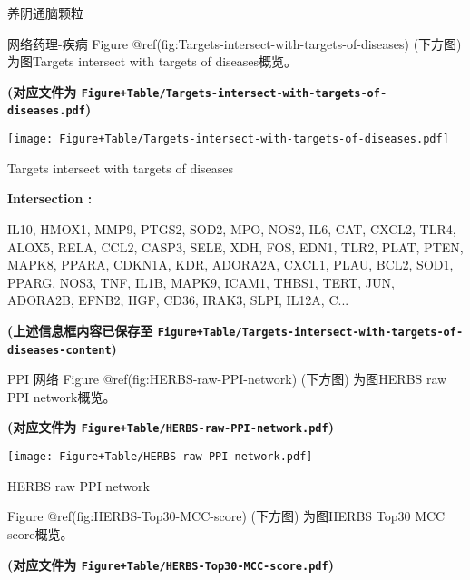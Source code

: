 \documentclass[
  ignorenonframetext,
]{beamer}
\begin{document}
\begin{frame}[fragile]{养阴通脑颗粒}
\begin{block}{网络药理-疾病}
Figure @ref(fig:Targets-intersect-with-targets-of-diseases) (下方图)
为图Targets intersect with targets of diseases概览。

\textbf{(对应文件为
\texttt{Figure+Table/Targets-intersect-with-targets-of-diseases.pdf})}

\def\@captype{figure}
\begin{center}
\texttt{[image: Figure+Table/Targets-intersect-with-targets-of-diseases.pdf]}
\caption{Targets intersect with targets of diseases}\label{fig:Targets-intersect-with-targets-of-diseases}
\end{center}
\begin{center}\begin{tcolorbox}[colback=gray!10, colframe=gray!50, width=0.9\linewidth, arc=1mm, boxrule=0.5pt]
\textbf{
Intersection
:}

\vspace{0.5em}

    IL10, HMOX1, MMP9, PTGS2, SOD2, MPO, NOS2, IL6, CAT,
CXCL2, TLR4, ALOX5, RELA, CCL2, CASP3, SELE, XDH, FOS,
EDN1, TLR2, PLAT, PTEN, MAPK8, PPARA, CDKN1A, KDR, ADORA2A,
CXCL1, PLAU, BCL2, SOD1, PPARG, NOS3, TNF, IL1B, MAPK9,
ICAM1, THBS1, TERT, JUN, ADORA2B, EFNB2, HGF, CD36, IRAK3,
SLPI, IL12A, C...

\vspace{2em}
\end{tcolorbox}
\end{center}

\textbf{(上述信息框内容已保存至
\texttt{Figure+Table/Targets-intersect-with-targets-of-diseases-content})}
\end{block}

\begin{block}{PPI 网络}
\protect\hypertarget{ppi-ux7f51ux7edc}{}
Figure @ref(fig:HERBS-raw-PPI-network) (下方图) 为图HERBS raw PPI
network概览。

\textbf{(对应文件为 \texttt{Figure+Table/HERBS-raw-PPI-network.pdf})}

\def\@captype{figure}
\begin{center}
\texttt{[image: Figure+Table/HERBS-raw-PPI-network.pdf]}
\caption{HERBS raw PPI network}\label{fig:HERBS-raw-PPI-network}
\end{center}

Figure @ref(fig:HERBS-Top30-MCC-score) (下方图) 为图HERBS Top30 MCC
score概览。

\textbf{(对应文件为 \texttt{Figure+Table/HERBS-Top30-MCC-score.pdf})}


\end{block}
\end{frame}
\end{document}
